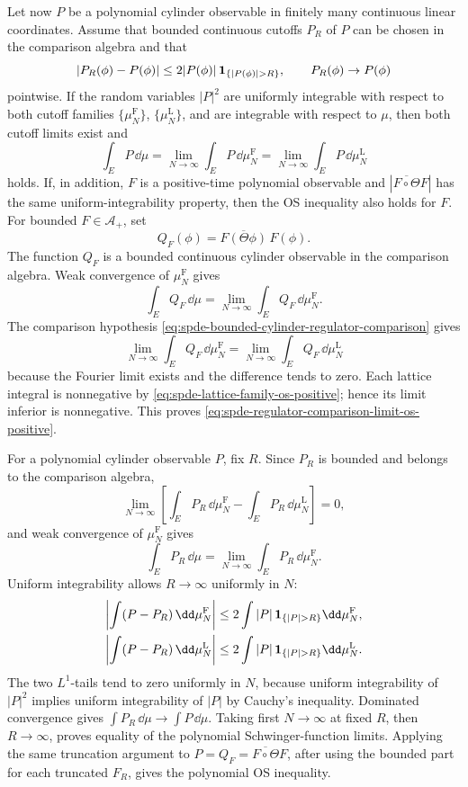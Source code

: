 \begin{remark}
Let now \(P\) be a polynomial cylinder observable in finitely many continuous
linear coordinates.  Assume that bounded continuous cutoffs \(P_R\) of
\(P\) can be chosen in the comparison algebra and that
\[
  |P_R(\phi)-P(\phi)|
  \leq
  2|P(\phi)|\,{\bf 1}_{\{|P(\phi)|>R\}},
  \qquad
  P_R(\phi)\to P(\phi)
\]
pointwise.  If the random variables \(|P|^2\) are uniformly integrable with
respect to both cutoff families
\(\{\mu_N^{\mathrm F}\}\), \(\{\mu_N^{\mathrm L}\}\), and are integrable
with respect to \(\mu\), then both cutoff limits exist and
\[
  \int_E P\,\dd\mu
  =
  \lim_{N\to\infty}\int_E P\,\dd\mu_N^{\mathrm F}
  =
  \lim_{N\to\infty}\int_E P\,\dd\mu_N^{\mathrm L}
\]
holds.  If, in addition, \(F\) is a positive-time polynomial observable and
\(|\overline{F\circ\Theta}F|\) has the same uniform-integrability property,
then the OS inequality also holds for \(F\).
For bounded \(F\in\mathcal A_+\), set
\[
  Q_F(\phi)=\overline{F(\Theta\phi)}\,F(\phi).
\]
The function \(Q_F\) is a bounded continuous cylinder observable in the
comparison algebra.  Weak convergence of \(\mu_N^{\mathrm F}\) gives
\[
  \int_E Q_F\,\dd\mu
  =
  \lim_{N\to\infty}\int_E Q_F\,\dd\mu_N^{\mathrm F}.
\]
The comparison hypothesis
\eqref{eq:spde-bounded-cylinder-regulator-comparison} gives
\[
  \lim_{N\to\infty}\int_E Q_F\,\dd\mu_N^{\mathrm F}
  =
  \lim_{N\to\infty}\int_E Q_F\,\dd\mu_N^{\mathrm L}
\]
because the Fourier limit exists and the difference tends to zero.  Each
lattice integral is nonnegative by
\eqref{eq:spde-lattice-family-os-positive}; hence its limit inferior is
nonnegative.  This proves
\eqref{eq:spde-regulator-comparison-limit-os-positive}.

For a polynomial cylinder observable \(P\), fix \(R\).  Since \(P_R\) is
bounded and belongs to the comparison algebra,
\[
  \lim_{N\to\infty}
  \left[
    \int_E P_R\,\dd\mu_N^{\mathrm F}
    -
    \int_E P_R\,\dd\mu_N^{\mathrm L}
  \right]
  =0,
\]
and weak convergence of \(\mu_N^{\mathrm F}\) gives
\[
  \int_E P_R\,\dd\mu
  =
  \lim_{N\to\infty}\int_E P_R\,\dd\mu_N^{\mathrm F}.
\]
Uniform integrability allows \(R\to\infty\) uniformly in \(N\):
\[
\begin{aligned}
  \left|
    \int(P-P_R)\,\dd\mu_N^{\mathrm F}
  \right|
  &\leq
  2\int |P|\,{\bf 1}_{\{|P|>R\}}\dd\mu_N^{\mathrm F},\\
  \left|
    \int(P-P_R)\,\dd\mu_N^{\mathrm L}
  \right|
  &\leq
  2\int |P|\,{\bf 1}_{\{|P|>R\}}\dd\mu_N^{\mathrm L}.
\end{aligned}
\]
The two \(L^1\)-tails tend to zero uniformly in \(N\), because uniform
integrability of \(|P|^2\) implies uniform integrability of \(|P|\) by
Cauchy's inequality.  Dominated convergence gives
\(\int P_R\,\dd\mu\to\int P\,\dd\mu\).  Taking first \(N\to\infty\) at fixed
\(R\), then \(R\to\infty\), proves equality of the polynomial
Schwinger-function limits.  Applying the same truncation argument to
\(P=Q_F=\overline{F\circ\Theta}F\), after using the bounded part for each
truncated \(F_R\), gives the polynomial OS inequality.
\end{remark}

